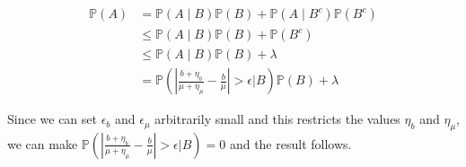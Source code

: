 \documentclass{article}
\theoremstyle{thmstyleone}%
\theoremstyle{thmstyletwo}%
\theoremstyle{thmstylethree}%
\begin{document}
\begin{align*}
    \mathbb{P} \left( A \right) &= \mathbb{P} \left( A \mid B \right) \mathbb{P}(B) + \mathbb{P} \left( A \mid B^c \right) \mathbb{P}(B^c)\\
    &\leq\mathbb{P} \left( A \mid B \right) \mathbb{P}(B)  + \mathbb{P}(B^c)\\
    &\leq  \mathbb{P} \left( A \mid B \right) \mathbb{P}(B) + \lambda \\
    &= \mathbb{P} \left( \left| \frac{b + \eta_b}{\mu + \eta_\mu} - \frac{b}{\mu} \right| > \epsilon \Big| B \right)\mathbb{P}(B) + \lambda
\end{align*}

Since we can set $\epsilon_b$ and $\epsilon_{\mu}$ arbitrarily small and this restricts the values $\eta_b$ and $\eta_\mu$, we can make $\mathbb{P} \left( \left| \frac{b + \eta_b}{\mu + \eta_\mu} - \frac{b}{\mu} \right| > \epsilon \Big| B \right) = 0$ and the result follows.
\end{document}
